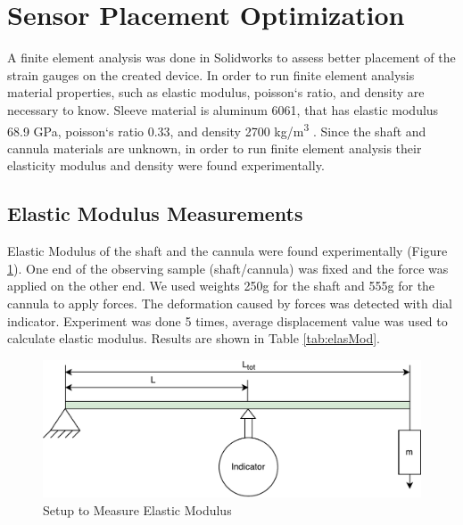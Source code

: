 \section{Sensor Placement Optimization}
\label{sec:SimMod}
A finite element analysis was done in Solidworks to assess better placement of the strain gauges on the created device. In order to run finite element analysis material properties, such as elastic modulus, poisson`s ratio, and density are necessary to know. Sleeve material is aluminum 6061, that has elastic modulus 68.9 GPa, poisson`s ratio 0.33, and density 2700 kg/m\textsuperscript{3} \cite{aluminum_properties}. Since the shaft and cannula materials are unknown, in order to run finite element analysis their elasticity modulus and density were found experimentally.
	
	\subsection{Elastic Modulus Measurements}
	\label{sec:ElasMod}
	Elastic Modulus of the shaft and the cannula were found experimentally (Figure \ref{fig:ElasModSet}). One end of the observing sample (shaft/cannula) was fixed and the force was applied on the other end. We used weights 250g for the shaft and 555g for the cannula to apply forces. The deformation caused by forces was detected with dial indicator. Experiment was done 5 times, average displacement value was used to calculate elastic modulus. Results are shown in Table \ref{tab:elasMod}.
	
\begin{figure}[h]
	\begin{center}
		\includegraphics[width=120mm]{fig/methods/el_mod_set.pdf}
	\end{center}
	\vspace{-4mm}
	\caption[Setup to Measure Elastic Modulus]
	{Setup to Measure Elastic Modulus}
	\label{fig:ElasModSet}
	\vspace{-2mm}
\end{figure}

